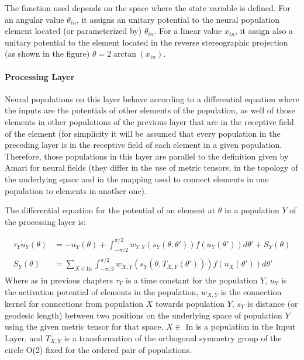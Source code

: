 The function used depends on the space where the state variable is
defined. For an angular value $\theta_{in}$, it assigns an unitary
potential to the neural population element located (or parameterized
by) $\theta_{in}$. For a linear value $x_{in}$, it assign also a
unitary potential to the element located in the reverse stereographic
projection (as shown in the figure) $\theta=2\arctan
(x_{in})$.  %

\paragraph{Processing Layer}
Neural populations on this layer behave according to a differential
equation where the inputs are the potentials of other elements of the
population, as well of those elements in other populations of the
previous layer that are in the receptive field of the element (for
simplicity it will be assumed that every population in the preceding
layer is in the receptive field of each element in a given
population. Therefore, those populations in this layer are parallel to
the definition given by Amari for neural fields (they differ in the
use of metric tensors, in the topology of the underlying space and in
the mapping used to connect elements in one population to elements in
another one).

The differential equation for the potential of an element at $\theta$
in a population $Y$ of the processing layer is:

\begin{align}
  \label{eq:lnf-oned}
  \tau_Y\dot{u}_Y(\theta)&=-u_Y(\theta)+\int_{-\pi/2}^{\pi/2}{w_{Y,Y}\left(s_Y(\theta,\theta')
    \right) f\left(u_Y(\theta') \right) d\theta'} + S_Y(\theta) \\
  S_Y(\theta)&=\sum_{X \in
    \mathrm{In}}\int_{-\pi/2}^{\pi/2}{w_{X,Y}\left(s_Y(\theta,T_{X,Y}(\theta'))
    \right) f\left(u_X(\theta') \right) d\theta'}
\end{align}
Where as in previous chapters $\tau_Y$ is a time constant for the
population $Y$, $u_Y$ is the activation potential of elements in the
population, $w_{X,Y}$ is the connection kernel for connections from
population $X$ towards population $Y$, $s_Y$ is distance (or geodesic
length) between two positions on the underlying space of population
$Y$ using the given metric tensor for that space, $X \in $ In is a
population in the Input Layer, and $T_{X,Y}$ is a transformation of
the orthogonal symmetry group of the circle O(2) fixed for the ordered
pair of populations.

